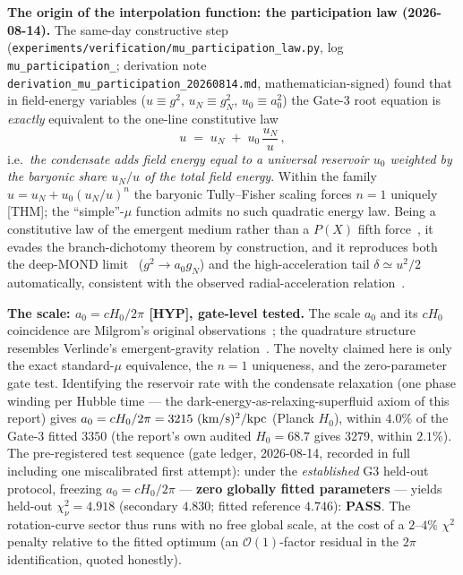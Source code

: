 \documentclass[a4paper,12pt]{article}
\begin{document}
\textbf{The origin of the interpolation function: the participation law (2026-08-14).}
The same-day constructive step
(\texttt{experiments/\allowbreak verification/\allowbreak mu\_\allowbreak participation\_\allowbreak law.py}, log
\texttt{mu\_\allowbreak participation\_}; derivation note
\texttt{derivation\_\allowbreak mu\_\allowbreak participation\_\allowbreak 20260814.md}, mathematician-signed) found that in
field-energy variables ($u \equiv g^2$, $u_N \equiv g_N^2$, $u_0 \equiv a_0^2$) the
Gate-3 root equation is \emph{exactly} equivalent to the one-line constitutive law
\begin{equation}
    u \;=\; u_N \;+\; u_0\,\frac{u_N}{u}\,,
    \label{eq:participation}
\end{equation}
i.e.\ \emph{the condensate adds field energy equal to a universal reservoir $u_0$
weighted by the baryonic share $u_N/u$ of the total field energy}. Within the family
$u = u_N + u_0(u_N/u)^n$ the baryonic Tully--Fisher scaling forces $n=1$ uniquely
[THM]; the ``simple''-$\mu$ function admits no such quadratic energy law. Being a
constitutive law of the emergent medium rather than a $P(X)$ fifth force~\cite{bekensteinmilgrom1984}, it evades the
branch-dichotomy theorem by construction, and it reproduces both the deep-MOND limit~\cite{famaey2012}
($g^2 \to a_0 g_N$) and the high-acceleration tail $\delta \simeq u^2/2$ automatically, consistent with the observed radial-acceleration relation~\cite{mcgaugh2016}.

\textbf{The scale: $a_0 = cH_0/2\pi$ [HYP], gate-level tested.} The scale $a_0$ and its $cH_0$ coincidence are Milgrom's original observations~\cite{milgrom1983}; the quadrature structure resembles Verlinde's emergent-gravity relation~\cite{verlinde2016}. The novelty claimed here is only the exact standard-$\mu$ equivalence, the $n=1$ uniqueness, and the zero-parameter gate test. Identifying the
reservoir rate with the condensate relaxation (one phase winding per Hubble time --- the
dark-energy-as-relaxing-superfluid axiom of this report) gives $a_0 = cH_0/2\pi = 3215\
{\rm (km/s)^2/kpc}$ (Planck $H_0$), within $4.0\%$ of the Gate-3 fitted $3350$ (the
report's own audited $H_0 = 68.7$ gives $3279$, within $2.1\%$). The pre-registered test
sequence (gate ledger, 2026-08-14, recorded in full including one miscalibrated first
attempt): under the \emph{established} G3 held-out protocol, freezing
$a_0 = cH_0/2\pi$ --- \textbf{zero globally fitted parameters} --- yields held-out
$\chi^2_\nu = 4.918$ (secondary $4.830$; fitted reference $4.746$): \textbf{PASS}. The
rotation-curve sector thus runs with no free global scale, at the cost of a
$2$--$4\%$ $\chi^2$ penalty relative to the fitted optimum (an $\mathcal{O}(1)$-factor
residual in the $2\pi$ identification, quoted honestly).
\end{document}
